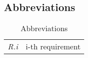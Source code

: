\subsection{Abbreviations}

\begin{center}
\setlength\tabcolsep{7pt}
\renewcommand{\arraystretch}{2}
\begin{longtable}{|m{1.5cm}|m{8.6cm}|}
\caption{Abbreviations}\\
\hline
\endfirsthead
\endhead
\hline
\endlastfoot
\textit{R.i} & i-th requirement\\
\end{longtable}
\end{center}
